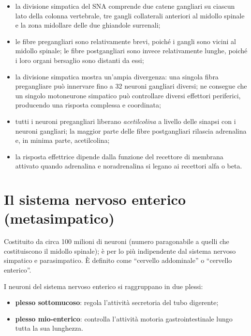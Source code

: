 \begin{itemize}
  \item la divisione simpatica del SNA comprende due catene gangliari su
    ciascun lato della colonna vertebrale, tre gangli collaterali
    anteriori al midollo spinale e la zona midollare delle due ghiandole
    surrenali;
  \item le fibre pregangliari sono relativamente brevi, poiché i gangli
    sono vicini al midollo spinale; le fibre postgangliari sono invece
    relativamente lunghe, poiché i loro organi bersaglio sono distanti da
    essi;
  \item la divisione simpatica mostra un'ampia divergenza: una singola
    fibra pregangliare può innervare fino a 32 neuroni gangliari diversi;
    ne consegue che un singolo motoneurone simpatico può controllare
    diversi effettori periferici, producendo una risposta complessa e
    coordinata;
  \item tutti i neuroni pregangliari liberano \textit{acetilcolina} a
    livello delle sinapsi con i neuroni gangliari; la maggior parte delle
    fibre postgangliari rilascia adrenalina e, in minima parte,
    acetilcolina;
  \item la risposta effettrice dipende dalla funzione del recettore di
    membrana attivato quando adrenalina e noradrenalina si legano ai
    recettori alfa o beta.
\end{itemize}

\section{Il sistema nervoso enterico (metasimpatico)}

Costituito da circa 100 milioni di neuroni (numero paragonabile a quelli
che costituiscono il midollo spinale); è per lo più indipendente dal
sistema nervoso simpatico e parasimpatico. È definito come ``cervello
addominale'' o ``cervello enterico''.

I neuroni del sistema nervoso enterico si raggruppano in due plessi:
\begin{itemize}
  \item \textbf{plesso sottomucoso}: regola l'attività secretoria del
    tubo digerente;
  \item \textbf{plesso mio-enterico}: controlla l'attività motoria
    gastrointestinale lungo tutta la sua lunghezza.
\end{itemize}

